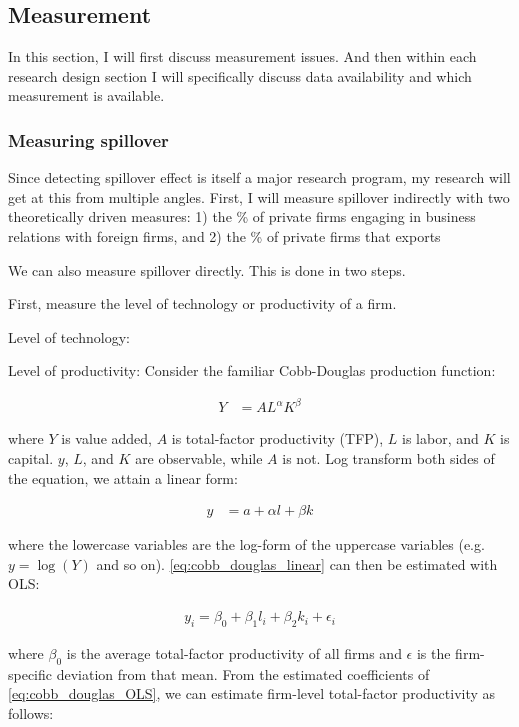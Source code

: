 \subsection{Measurement}

In this section, I will first discuss measurement issues. And then within each research design section I will specifically discuss data availability and which measurement is available.

\subsubsection{Measuring spillover}

Since detecting spillover effect is itself a major research program, my research will get at this from multiple angles. First, I will measure spillover indirectly with two theoretically driven measures: 1) the \% of private firms engaging in business relations with foreign firms, and 2) the \% of private firms that exports

We can also measure spillover directly. This is done in two steps.

First, measure the level of technology or productivity of a firm.

Level of technology: 

Level of productivity: Consider the familiar Cobb-Douglas production function:

\begin{align}
Y &= AL^{\alpha}K^{\beta}
\end{align}

where $Y$ is value added, $A$ is total-factor productivity (TFP), $L$ is labor, and $K$ is capital. $y$, $L$, and $K$ are observable, while $A$ is not. Log transform both sides of the equation, we attain a linear form:

\begin{align} \label{eq:cobb_douglas_linear}
y &= a + \alpha l + \beta k
\end{align}

where the lowercase variables are the log-form of the uppercase variables (e.g. $y = \log(Y)$ and so on). \autoref{eq:cobb_douglas_linear} can then be estimated with OLS:

\begin{align} \label{eq:cobb_douglas_OLS}
y_i = \beta_0 + \beta_1 l_i + \beta_2 k_i + \epsilon_i
\end{align} 

where $\beta_0$ is the average total-factor productivity of all firms and $\epsilon$ is the firm-specific deviation from that mean. From the estimated coefficients of \autoref{eq:cobb_douglas_OLS}, we can estimate firm-level total-factor productivity as follows:

